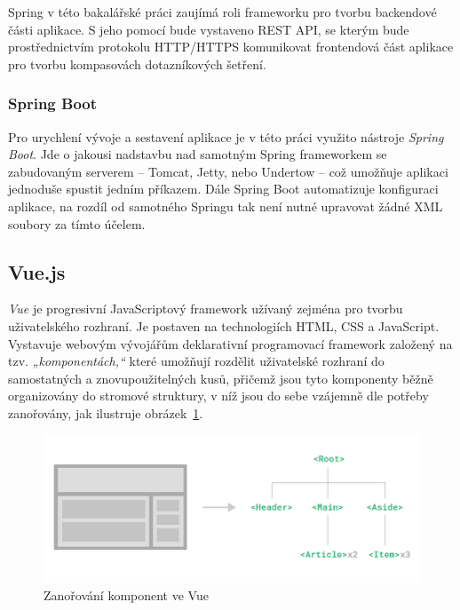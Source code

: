 Spring v této bakalářské práci zaujímá roli frameworku pro tvorbu backendové části aplikace. S jeho pomocí bude vystaveno REST API, se kterým bude prostřednictvím protokolu HTTP/HTTPS komunikovat frontendová část aplikace pro tvorbu kompasovách dotazníkových šetření.

\subsubsection{Spring Boot}
Pro urychlení vývoje a sestavení aplikace je v této práci využito nástroje \textit{Spring Boot}. Jde o jakousi nadstavbu nad samotným Spring frameworkem se zabudovaným serverem – Tomcat, Jetty, nebo Undertow – což umožňuje aplikaci jednoduše spustit jedním příkazem. Dále Spring Boot automatizuje konfiguraci aplikace, na rozdíl od samotného Springu tak není nutné upravovat žádné XML soubory za tímto účelem.~\cite{spring}


\subsection{Vue.js}
\label{subsection:vue}
\textit{Vue} je progresivní JavaScriptový framework užívaný zejména pro tvorbu uživatelského rozhraní. Je postaven na technologiích HTML, CSS a JavaScript. Vystavuje webovým vývojářům deklarativní programovací framework založený na tzv. \textit{„komponentách,“} které umožňují rozdělit uživatelské rozhraní do samostatných a znovupoužitelných kusů, přičemž jsou tyto komponenty běžně organizovány do stromové struktury, v níž jsou do sebe vzájemně dle potřeby zanořovány, jak ilustruje obrázek~\ref{fig:vuecomponent}.\cite{vue}

\begin{figure}[h!]
    \centering
    \includegraphics[width=\textwidth]{images/vuecomponents.png}
    \caption{Zanořování komponent ve Vue~\cite{vue}}
    \label{fig:vuecomponent}
\end{figure}


